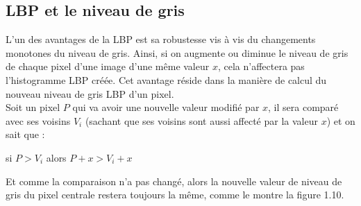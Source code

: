\subsection{LBP et le niveau de gris}
\indent L'un des avantages de la LBP est sa robustesse vis à vis du changements monotones du niveau de gris. Ainsi, si on augmente ou diminue le niveau de gris de chaque pixel d'une image d'une même valeur $x$, cela n'affectera pas l'histogramme LBP créée. Cet avantage réside dans la manière de calcul du nouveau niveau de gris LBP d'un pixel.\\
\indent Soit un pixel $P$ qui va avoir une nouvelle valeur modifié par $x$, il sera comparé avec ses voisins $V_{i}$ (sachant que ses voisins sont aussi affecté par la valeur $x$) et on sait que :
\begin{center}
si $P > V_{i}$ alors $P + x > V_{i} + x $
\end{center}
\indent Et comme la comparaison n'a pas changé, alors la nouvelle valeur de niveau de gris du pixel centrale restera toujours la même, comme le montre la figure 1.10.\

